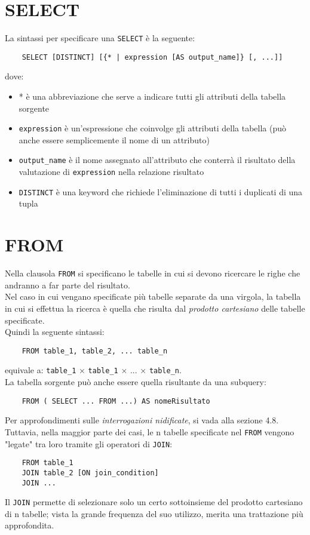 \documentclass[12pt,a4paper]{book}
\begin{document}
	\section{SELECT}
	La sintassi per specificare una \texttt{SELECT} è la seguente:
	\begin{lstlisting}
	SELECT [DISTINCT] [{* | expression [AS output_name]} [, ...]]
	\end{lstlisting}
	dove:
	\begin{itemize}
		\item * è una abbreviazione che serve a indicare tutti gli attributi della tabella sorgente 
		\item \texttt{expression} è un’espressione che coinvolge gli attributi della tabella (può
		anche essere semplicemente il nome di un attributo)
		\item \texttt{output_name} è il nome assegnato all’attributo che conterrà il risultato della valutazione di \texttt{expression} nella relazione risultato
		\item \texttt{DISTINCT} è una keyword che richiede l'eliminazione di tutti i duplicati di una tupla
	\end{itemize}
	\section{FROM}
	Nella clausola \texttt{FROM} si specificano le tabelle in cui si devono ricercare le righe che andranno a far parte del risultato.\\
	Nel caso in cui vengano specificate più tabelle separate da una virgola, la tabella in cui si effettua la ricerca è quella che risulta dal \textit{prodotto cartesiano} delle tabelle specificate.\\ Quindi la seguente sintassi:
	\begin{lstlisting}
	FROM table_1, table_2, ... table_n
	\end{lstlisting}
	equivale a: \texttt{table_1} $\times$ \texttt{table_1} $\times$ ... $\times$ \texttt{table_n}.\\
	La tabella sorgente può anche essere quella risultante da una subquery:
	\begin{lstlisting}
	FROM ( SELECT ... FROM ...) AS nomeRisultato
	\end{lstlisting}
	Per approfondimenti sulle \textit{interrogazioni nidificate}, si vada alla sezione 4.8.\\
	Tuttavia, nella maggior parte dei casi, le n tabelle specificate nel \texttt{FROM} vengono "legate" tra loro tramite gli operatori di \texttt{JOIN}:
	\begin{lstlisting}
	FROM table_1
	JOIN table_2 [ON join_condition]
	JOIN ...
	\end{lstlisting}
	Il \texttt{JOIN} permette di selezionare solo un certo sottoinsieme del prodotto cartesiano di n tabelle; vista la grande frequenza del suo utilizzo, merita una trattazione più approfondita.
\end{document}
